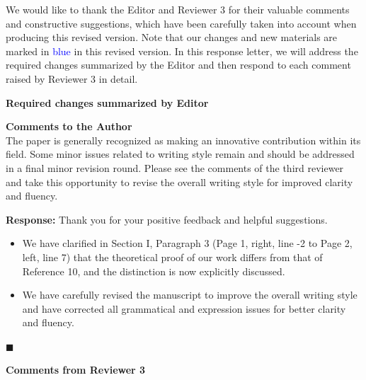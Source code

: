 \documentclass[12pt]{article}
\begin{document}
\begin{center}
\end{center}


\bigskip

We would like to thank the Editor and Reviewer 3 for their valuable comments and constructive suggestions, which have been carefully taken into account when producing this revised version. 
Note that our changes and new materials are marked in \textcolor{blue}{blue} in this revised version. 
In this response letter, we will address the required changes summarized by the Editor and then respond to each comment raised by Reviewer 3 in detail.


\bigskip

\noindent
\textbf{\Large Required changes summarized by Editor}

\begin{shaded}
    \noindent \textbf{Comments to the Author}\\
The paper is generally recognized as making an innovative contribution within its field. Some minor issues related to writing style remain and should be addressed in a final minor revision round. Please see the comments of the third reviewer and take this opportunity to revise the overall writing style for improved clarity and fluency.   
\end{shaded}
\noindent \textbf{Response:}
Thank you for your positive feedback and helpful suggestions.
\begin{itemize}
\item We have clarified in Section I, Paragraph 3 (Page 1, right, line -2 to Page 2, left, line 7) that the theoretical proof of our work differs from that of Reference 10, and the distinction is now explicitly discussed.
\item We have carefully revised the manuscript to improve the overall writing style and have corrected all grammatical and expression issues for better clarity and fluency.
\end{itemize}
\hfill  $\blacksquare$


\bigskip
\pagebreak


\bigskip

\pagebreak

\noindent
\textbf{\Large Comments from Reviewer 3}
\end{document}
